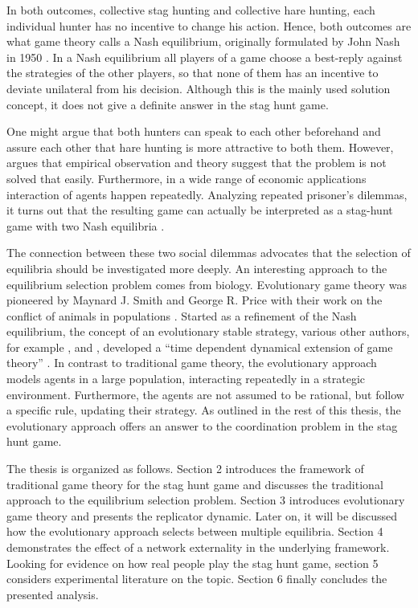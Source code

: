 In both outcomes, collective stag hunting and collective hare hunting,
each individual hunter has no incentive to change his action.
Hence, both outcomes are what game theory calls a Nash equilibrium, originally
formulated by John Nash in 1950 \parencite{nash_equilibrium_1950}. In a 
Nash equilibrium all players of a game choose a best-reply against
the strategies of the other players, so that none of them has an incentive
to deviate unilateral from his decision. Although this is the mainly used
solution concept, it does not give a definite answer in the stag hunt game.

One might argue that both hunters can speak to each other beforehand and
assure each other that hare hunting is more attractive to both them. 
However, \textcite{camerer_behavioral_2003}
argues that empirical observation and theory suggest that the problem is 
not solved that easily.
Furthermore, in a wide range of economic applications interaction of agents
happen repeatedly. Analyzing repeated prisoner's dilemmas, it turns 
out that the resulting game can actually be interpreted as a stag-hunt game with
two Nash equilibria \parencite{skyrms_stag_2004}.

The connection between these two social dilemmas advocates that
the selection of equilibria should be investigated more deeply. 
An interesting approach to the equilibrium selection problem comes from
biology. Evolutionary game theory was pioneered by Maynard J. Smith and George
R. Price with their work on the conflict of animals in populations 
\parencite{smith_lhe_1973}. Started as a refinement of the Nash equilibrium,
the concept of an evolutionary stable strategy, various other authors, for 
example \textcite{taylor_evolutionary_1978}, \textcite{hofbauer_note_1979} and
\textcite{zeeman_dynamics_1981}, developed a ``time dependent dynamical
extension of game theory'' \parencite[55]{hanauske_evolutionare_2011}.
In contrast to traditional game theory, the evolutionary approach  models
agents in a large population, interacting repeatedly in a strategic environment. 
Furthermore, the agents are not assumed to be rational, but follow a specific 
rule, updating their strategy. 
As outlined in the rest of this thesis, the
evolutionary approach offers an answer to the coordination
problem in the stag hunt game.

The thesis is organized as follows. Section 2 introduces the 
framework of traditional game theory for the stag hunt game and discusses
the traditional approach to the equilibrium selection problem. Section 3
introduces evolutionary game theory and presents the replicator dynamic. 
Later on, it will be discussed how the evolutionary approach selects
between multiple equilibria. Section 4 demonstrates the effect of a
network externality in the underlying framework. Looking for evidence on
how real people play the stag hunt game, section 5 considers experimental
literature on the topic. Section 6 finally concludes the presented analysis.

